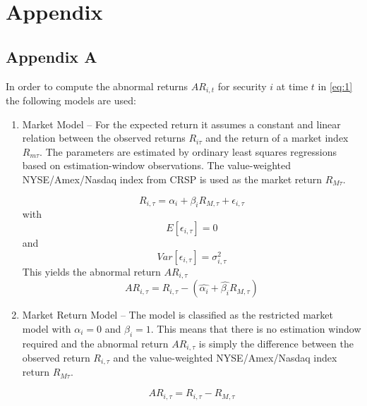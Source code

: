 \documentclass[12pt]{article}
\begin{document}
\section{Appendix}

\subsection{Appendix A}
In order to compute the abnormal returns $AR_{i,t}$ for security $i$ at time $t$ in \eqref{eq:1} the following models are used: 
\begin{enumerate}
	\item Market Model -- For the expected return it assumes a constant and linear relation between the observed returns $R_{i\tau}$ and the return of a market index $R_{m\tau}$. The parameters are estimated by ordinary least squares regressions based on estimation-window observations. The value-weighted NYSE/Amex/Nasdaq index from CRSP is used as the market return $R_{M\tau}$.

		\begin{equation}
			R_{i,\tau}=\alpha_{i}+\beta_{i}R_{M,\tau}+\epsilon_{i,\tau}
		\end{equation}
		with 
		\begin{equation}
			E[\epsilon_{i,\tau}]=0
		\end{equation}
		and 
		\begin{equation}
			Var[\epsilon_{i,\tau}]=\sigma^2_{i,\tau}
		\end{equation}
		This yields the abnormal return $AR_{i,\tau}$
		\begin{equation}
			AR_{i,\tau}=R_{i,\tau}-(\hat{\alpha_{i}}+\hat{\beta_{i}}R_{M,\tau})
		\end{equation}
		
	\item Market Return Model -- The model is classified as the restricted market model with $\alpha_{i}=0$ and $\beta_{i}=1$. This means that there is no estimation window required and the abnormal return $AR_{i,\tau}$ is simply the difference between the observed return $R_{i,\tau}$ and the value-weighted NYSE/Amex/Nasdaq index return $R_{M\tau}$.

		\begin{equation}\label{eq:6}
			AR_{i,\tau}=R_{i,\tau}-R_{M,\tau}
		\end{equation}

\end{enumerate}
\end{document}
